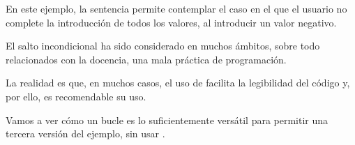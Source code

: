 \documentclass[letterpaper,10pt,english]{sphinxmanual}
\begin{document}

En este ejemplo, la sentencia  permite contemplar el caso
en el que el usuario no complete la introducción de todos los valores,
al introducir un valor negativo.

El salto incondicional  ha sido considerado en muchos ámbitos,
sobre todo relacionados con la docencia, una mala práctica de programación.

La realidad es que, en muchos casos, el uso de  facilita
la legibilidad del código y, por ello, es recomendable su uso.

Vamos a ver cómo un bucle  es lo suficientemente versátil para
permitir una tercera versión del ejemplo, sin usar .

\newpage

   
\end{document}
